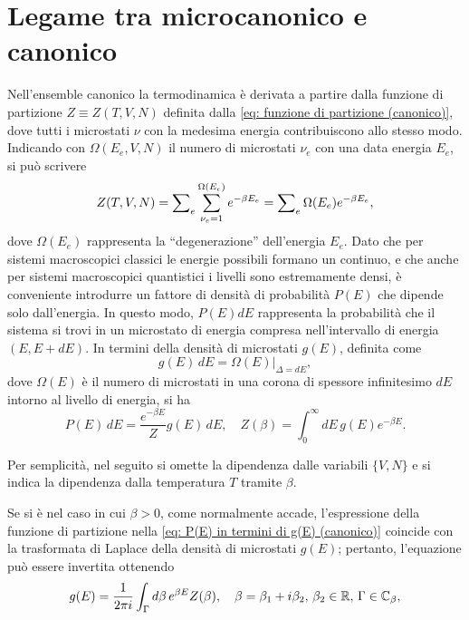 \section{Legame tra microcanonico e canonico}
Nell'ensemble canonico la termodinamica è derivata a partire dalla funzione di partizione $Z \equiv Z(T,V,N)$ definita dalla \eqref{eq: funzione di partizione (canonico)}, dove tutti i microstati $\nu$ con la medesima energia contribuiscono allo stesso modo. Indicando con $\Omega(E_e,V,N)$ il numero di microstati $\nu_e$ con una data energia $E_e$, si può scrivere
\begin{equation}
    Z(T,V,N) = \sum\nolimits_e\sum_{\nu_e = 1}^{\Omega(E_e)} e^{-\beta E_e} = \sum\nolimits_e\Omega(E_e)e^{-\beta E_e},
\end{equation}
dove $\Omega(E_e)$ rappresenta la ``degenerazione'' dell'energia $E_e$. Dato che per sistemi macroscopici classici le energie possibili formano un continuo, e che anche per sistemi macroscopici quantistici i livelli sono estremamente densi, è conveniente introdurre un fattore di densità di probabilità $P(E)$ che dipende solo dall'energia. In questo modo, $P(E)dE$ rappresenta la probabilità che il sistema si trovi in un microstato di energia compresa nell'intervallo di energia $(E, E + dE)$. In termini della densità di microstati $g(E)$, definita come
\begin{equation}
\label{eq: definizione g(E) (microcanonico)}
    g(E)\,dE = \Omega(E)|_{\Delta = dE},
\end{equation}
dove $\Omega(E)$ è il numero di microstati in una corona di spessore infinitesimo $dE$ intorno al livello di energia, si ha
\begin{equation}
\label{eq: P(E) in termini di g(E) (canonico)}
    P(E)\,dE = \frac{e^{-\beta E}}{Z}g(E)\,dE,\quad Z(\beta) = \int_0^\infty dE\,g(E)e^{-\beta E}.
\end{equation}
\begin{notz}
    Per semplicità, nel seguito si omette la dipendenza dalle variabili $\{V,N\}$ e si indica la dipendenza dalla temperatura $T$ tramite $\beta$.
\end{notz}
Se si è nel caso in cui $\beta > 0$, come normalmente accade, l'espressione della funzione di partizione nella \eqref{eq: P(E) in termini di g(E) (canonico)} coincide con la trasformata di Laplace della densità di microstati $g(E)$; pertanto, l'equazione può essere invertita ottenendo
\begin{equation}
\label{eq: g(E) in termini di Z(beta) (canonico)}
    g(E) = \frac{1}{2\pi i}\int_\Gamma d\beta\,e^{\beta E}Z(\beta),\quad \beta = \beta_1 + i\beta_2,\,\beta_2 \in \mathbb{R},\,\Gamma \in \mathbb{C}_\beta,
\end{equation}

